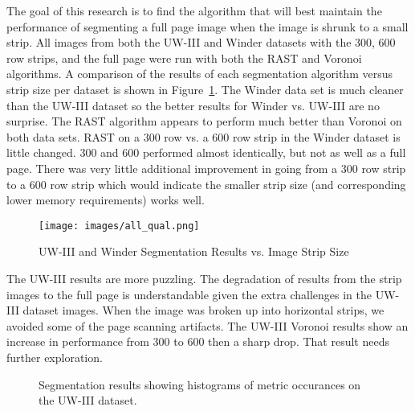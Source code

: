 \documentclass[conference]{IEEEtran}
\begin{document}
The goal of this research is to find the algorithm that will best maintain the
performance of segmenting a full page image when the image is shrunk to a small
strip.  All images from both the UW-III and Winder datasets with 
the 300, 600 row strips, and the full page were run with both the RAST and
Voronoi algorithms. 
A comparison of the results of each segmentation algorithm versus strip size per dataset
is shown in Figure~\ref{fig:all-qualitative}. 
The Winder data set is much cleaner than the UW-III dataset 
so the better results for Winder vs. UW-III are no surprise. 
The RAST algorithm appears to perform much better than Voronoi on both data sets.
RAST on a 300 row vs. a 600 row strip in the Winder dataset is little changed.
300 and 600 performed almost identically, but not as well as a full page. There
was very little additional improvement in going from a 300 row strip to a 600
row strip which would indicate the smaller strip size (and corresponding lower
memory requirements) works well.

\begin{figure}[all-qualitative]
\begin{center}
  \texttt{[image: images/all\_qual.png]}
\end{center}
\caption{UW-III and Winder Segmentation Results vs. Image Strip Size}
\label{fig:all-qualitative}
\end{figure}

The UW-III results are more puzzling. The degradation of results from the
strip images to the full page is understandable given the extra challenges in
the UW-III dataset images. When the image was broken up into horizontal strips,
we avoided some of the page scanning artifacts. The UW-III Voronoi results 
show an increase in performance from 300 to 600 then a sharp drop. That result
needs further exploration.

\begin{figure*}
\begin{center}
 {
 }
\end{center}
\caption{Segmentation results showing histograms of metric occurances on the UW-III dataset.}
\label{fig:uwiii_2x2}
\end{figure*}
\end{document}
